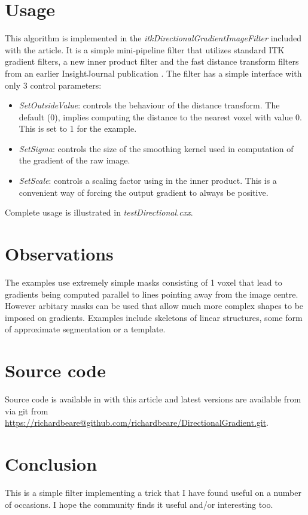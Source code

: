 \documentclass{InsightArticle}
\begin{document}
\section{Usage}
This algorithm is implemented in the {\em
  itkDirectionalGradientImageFilter} included with the article. It is
a simple mini-pipeline filter that utilizes standard ITK gradient
filters, a new inner product filter and the fast distance transform
filters from an earlier InsightJournal publication \cite{Beare2008e}. The filter has a simple interface with only 3 control parameters:
\begin{itemize}
\item {\em SetOutsideValue}: controls the behaviour of the distance transform. The default (0), implies computing the distance to the nearest voxel with value 0. This is set to 1 for the example.
\item {\em SetSigma}: controls the size of the smoothing kernel used in computation of the gradient of the raw image.
\item {\em SetScale}: controls a scaling factor using in the inner product. This is a convenient way of forcing the output gradient to always be positive. 
\end{itemize}
Complete usage is illustrated in {\em testDirectional.cxx}.

\section{Observations}
The examples use extremely simple masks consisting of 1 voxel that
lead to gradients being computed parallel to lines pointing away from
the image centre. However arbitary masks can be used that allow much
more complex shapes to be imposed on gradients. Examples include
skeletons of linear structures, some form of approximate segmentation
or a template.
\section{Source code}
Source code is available in with this article and latest versions are
available from via git from
\url{https://richardbeare@github.com/richardbeare/DirectionalGradient.git}.
\section{Conclusion}
This is a simple filter implementing a trick that I have found useful
on a number of occasions. I hope the community finds it useful and/or
interesting too.

 
\nocite{ITKSoftwareGuide}
\end{document}
